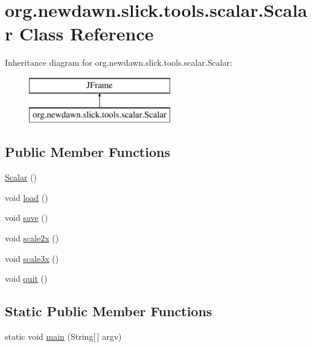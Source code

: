\hypertarget{classorg_1_1newdawn_1_1slick_1_1tools_1_1scalar_1_1_scalar}{}\section{org.\+newdawn.\+slick.\+tools.\+scalar.\+Scalar Class Reference}
\label{classorg_1_1newdawn_1_1slick_1_1tools_1_1scalar_1_1_scalar}
Inheritance diagram for org.\+newdawn.\+slick.\+tools.\+scalar.\+Scalar\+:\begin{figure}[H]
\begin{center}
\leavevmode
\includegraphics[height=2.000000cm]{classorg_1_1newdawn_1_1slick_1_1tools_1_1scalar_1_1_scalar}
\end{center}
\end{figure}
\subsection*{Public Member Functions}
\begin{DoxyCompactItemize}
\item 
\mbox{\hyperlink{classorg_1_1newdawn_1_1slick_1_1tools_1_1scalar_1_1_scalar_a9041a9bf0c10b24ed8d96c6acd056019}{Scalar}} ()
\item 
void \mbox{\hyperlink{classorg_1_1newdawn_1_1slick_1_1tools_1_1scalar_1_1_scalar_a52e46006fcc3c6987af1643a97d2d7ef}{load}} ()
\item 
void \mbox{\hyperlink{classorg_1_1newdawn_1_1slick_1_1tools_1_1scalar_1_1_scalar_a68119c1aa5736c2a2f65ffe6f62f6ee9}{save}} ()
\item 
void \mbox{\hyperlink{classorg_1_1newdawn_1_1slick_1_1tools_1_1scalar_1_1_scalar_af7a11c387283a843d0991eeb7f9f7b17}{scale2x}} ()
\item 
void \mbox{\hyperlink{classorg_1_1newdawn_1_1slick_1_1tools_1_1scalar_1_1_scalar_a708bacdbf38e24c992ca8d919b2c8aed}{scale3x}} ()
\item 
void \mbox{\hyperlink{classorg_1_1newdawn_1_1slick_1_1tools_1_1scalar_1_1_scalar_ae0f2111b7ad2a03db31292f6ad5f9502}{quit}} ()
\end{DoxyCompactItemize}
\subsection*{Static Public Member Functions}
\begin{DoxyCompactItemize}
\item 
static void \mbox{\hyperlink{classorg_1_1newdawn_1_1slick_1_1tools_1_1scalar_1_1_scalar_a291af21bfb69996922012f2967009677}{main}} (String\mbox{[}$\,$\mbox{]} argv)
\end{DoxyCompactItemize}
